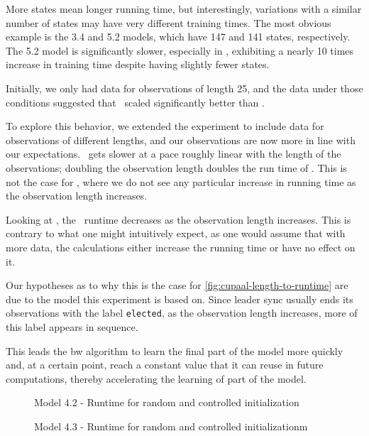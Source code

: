 More states mean longer running time, but interestingly, variations with a similar number of states may have very different training times.
The most obvious example is the 3.4 and 5.2 models, which have 147 and 141 states, respectively.
The 5.2 model is significantly slower, especially in \Cupaal, exhibiting a nearly 10 times increase in training time despite having slightly fewer states.

Initially, we only had data for observations of length 25, and the data under those conditions suggested that \Jajapy\ scaled significantly better than \Cupaal.

To explore this behavior, we extended the experiment to include data for observations of different lengths, and our observations are now more in line with our expectations.
\Jajapy\ gets slower at a pace roughly linear with the length of the observations; doubling the observation length doubles the run time of \Jajapy.
This is not the case for \Cupaal, where we do not see any particular increase in running time as the observation length increases.

Looking at , the \Cupaal\ runtime decreases as the observation length increases.
This is contrary to what one might intuitively expect, as one would assume that with more data, the calculations either increase the running time or have no effect on it.

Our hypotheses as to why this is the case for \autoref{fig:cupaal-length-to-runtime} are due to the model this experiment is based on.
Since leader sync usually ends its observations with the label \texttt{elected}, as the observation length increases, more of this label appears in sequence.

This leads the \gls{bw} algorithm to learn the final part of the model more quickly and, at a certain point, reach a constant value that it can reuse in future computations, thereby accelerating the learning of part of the model.


\begin{figure}
    
    \caption{Model 4.2 - Runtime for random and controlled initialization}
    \label{fig:semirandom-cupaal-jajapy-4-2}
\end{figure}

\begin{figure}
    
    \caption{Model 4.3 - Runtime for random and controlled initializationm}
    \label{fig:semirandom-cupaal-jajapy-4-3}
\end{figure}

